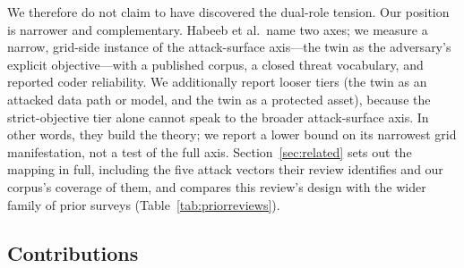 \documentclass[preprint,12pt]{elsarticle}
\renewcommand{\_}{\plainunderscore\allowbreak}
\begin{document}
We therefore do not claim to have discovered the dual-role tension. Our position is narrower and
complementary. Habeeb et al.\ name two axes; we measure a narrow, grid-side instance of the
attack-surface axis---the twin as the adversary's explicit objective---with a published
corpus, a closed threat vocabulary, and reported coder reliability. We additionally report
looser tiers (the twin as an attacked data path or model, and the twin as a protected asset),
because the strict-objective tier alone cannot speak to the broader attack-surface axis.
In other words, they build the theory; we report a lower bound on its narrowest grid
manifestation, not a test of the full axis. Section~\ref{sec:related} sets out the mapping in full, including the five attack vectors their
review identifies and our corpus's coverage of them, and compares this review's design with
the wider family of prior surveys (Table~\ref{tab:priorreviews}).

\subsection{Contributions}
\end{document}
